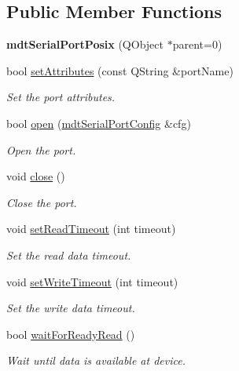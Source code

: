 \subsection*{Public Member Functions}
\begin{DoxyCompactItemize}
\item 
\hypertarget{classmdt_serial_port_posix_ab42543a4500bc207985ddad3082b1f4c}{
{\bfseries mdtSerialPortPosix} (QObject $\ast$parent=0)}
\label{classmdt_serial_port_posix_ab42543a4500bc207985ddad3082b1f4c}

\item 
bool \hyperlink{classmdt_serial_port_posix_a1440f504f0ed43210b9c0b1cd5506663}{setAttributes} (const QString \&portName)
\begin{DoxyCompactList}\small\item\em Set the port attributes. \end{DoxyCompactList}\item 
bool \hyperlink{classmdt_serial_port_posix_afb1bcf27cc39cd962913b056ca8d4ccc}{open} (\hyperlink{classmdt_serial_port_config}{mdtSerialPortConfig} \&cfg)
\begin{DoxyCompactList}\small\item\em Open the port. \end{DoxyCompactList}\item 
void \hyperlink{classmdt_serial_port_posix_a29df8d6b7c74bd7e3bf8513987bdd2a2}{close} ()
\begin{DoxyCompactList}\small\item\em Close the port. \end{DoxyCompactList}\item 
void \hyperlink{classmdt_serial_port_posix_a7cea8e6d04dac0645785e8bee7570cea}{setReadTimeout} (int timeout)
\begin{DoxyCompactList}\small\item\em Set the read data timeout. \end{DoxyCompactList}\item 
void \hyperlink{classmdt_serial_port_posix_ac8388d9e5411541ead6eab17c0661001}{setWriteTimeout} (int timeout)
\begin{DoxyCompactList}\small\item\em Set the write data timeout. \end{DoxyCompactList}\item 
bool \hyperlink{classmdt_serial_port_posix_a69ecbfb420544af72301e50635c4ba39}{waitForReadyRead} ()
\begin{DoxyCompactList}\small\item\em Wait until data is available at device. \end{DoxyCompactList}\item 

\end{DoxyCompactItemize}
